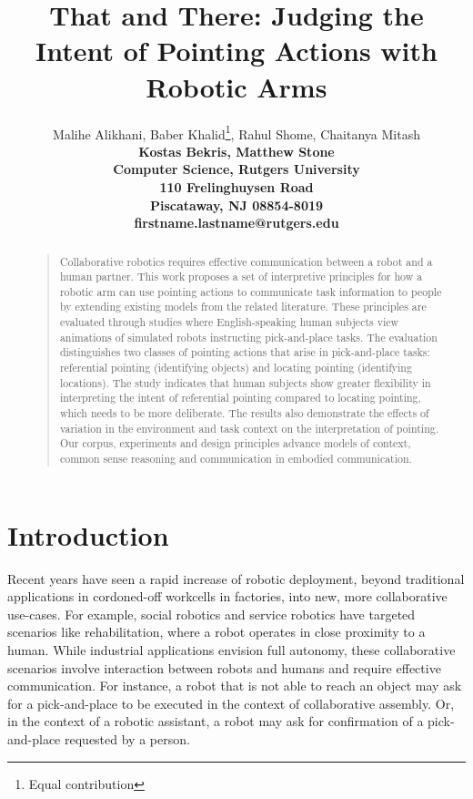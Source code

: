 \documentclass[letterpaper]{article} %
\title{That and There: Judging the Intent of Pointing Actions with Robotic Arms}
\author{Malihe Alikhani, Baber Khalid\thanks{Equal contribution}, Rahul Shome\footnotemark[1], Chaitanya Mitash\\
\bf \Large Kostas Bekris, Matthew Stone\\
Computer Science, Rutgers University\\
110 Frelinghuysen Road\\
Piscataway, NJ 08854-8019\\
firstname.lastname@rutgers.edu
}
\begin{document}
\maketitle
\begin{abstract}
\begin{quote}

Collaborative robotics requires effective communication between a robot and a human partner. This work proposes a set of interpretive principles for how a robotic arm can use pointing actions to communicate task information to people by extending existing models from the related literature. These principles are evaluated through studies where English-speaking human subjects view animations of simulated robots instructing pick-and-place tasks. The evaluation distinguishes two classes of pointing actions that arise in pick-and-place tasks: referential pointing (identifying objects) and locating pointing (identifying locations). The study indicates that human subjects show greater flexibility in interpreting the intent of referential pointing compared to locating pointing, which needs to be more deliberate. The results also demonstrate the effects of variation in the environment and task context on the interpretation of pointing. Our corpus, experiments and design principles advance models of context, common sense reasoning and communication in embodied communication.

\end{quote}
\end{abstract}

\section{Introduction}
\label{intro}

Recent years have seen a rapid increase of robotic deployment, beyond traditional applications in cordoned-off workcells in factories, into new, more collaborative use-cases. For example, social robotics and service robotics have targeted scenarios like rehabilitation, where a robot operates in close proximity to a human. While industrial applications envision full autonomy, these collaborative scenarios involve interaction between robots and humans and require effective communication. For instance, a robot that is not able to reach an object may ask for a pick-and-place to be executed in the context of collaborative assembly. Or, in the context of a robotic assistant, a robot may ask for confirmation of a pick-and-place requested by a person.
\end{document}
